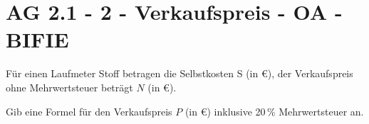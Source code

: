\section{AG 2.1 - 2 - Verkaufspreis - OA - BIFIE}

\begin{beispiel}[AG 2.1]{1} %
Für einen Laufmeter Stoff betragen die Selbstkosten S (in \euro), der Verkaufspreis ohne Mehrwertsteuer beträgt $N$ (in \euro).

Gib eine Formel für den Verkaufspreis $P$ (in \euro) inklusive 20\,\% Mehrwertsteuer an.


\end{beispiel}